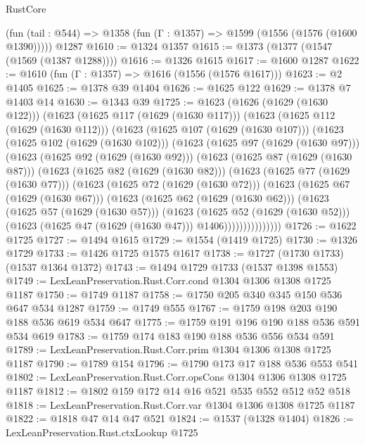 \begin{lexlean}{RustCore}
\begin{coremodule}
    (fun (tail : @544) => @1358 (fun (Γ : @1357) => @1599 (@1556 (@1576 (@1600 @1390)))))
    @1287
@1610 := @1324 @1357
@1615 := @1373 (@1377 (@1547 (@1569 (@1387 @1288))))
@1616 := @1326 @1615
@1617 := @1600 @1287
@1622 := @1610 (fun (Γ : @1357) => @1616 (@1556 (@1576 @1617)))
@1623 := @2 @1405
@1625 := @1378 @39 @1404
@1626 := @1625 @122
@1629 := @1378 @7 @1403 @14
@1630 := @1343 @39
@1725 := @1623
    (@1626 (@1629 (@1630 @122)))
    (@1623
      (@1625 @117 (@1629 (@1630 @117)))
      (@1623
        (@1625 @112 (@1629 (@1630 @112)))
        (@1623
          (@1625 @107 (@1629 (@1630 @107)))
          (@1623
            (@1625 @102 (@1629 (@1630 @102)))
            (@1623
              (@1625 @97 (@1629 (@1630 @97)))
              (@1623
                (@1625 @92 (@1629 (@1630 @92)))
                (@1623
                  (@1625 @87 (@1629 (@1630 @87)))
                  (@1623
                    (@1625 @82 (@1629 (@1630 @82)))
                    (@1623
                      (@1625 @77 (@1629 (@1630 @77)))
                      (@1623
                        (@1625 @72 (@1629 (@1630 @72)))
                        (@1623
                          (@1625 @67 (@1629 (@1630 @67)))
                          (@1623
                            (@1625 @62 (@1629 (@1630 @62)))
                            (@1623
                              (@1625 @57 (@1629 (@1630 @57)))
                              (@1623
                                (@1625 @52 (@1629 (@1630 @52)))
                                (@1623 (@1625 @47 (@1629 (@1630 @47))) @1406)))))))))))))))
@1726 := @1622 @1725
@1727 := @1494 @1615
@1729 := @1554 (@1419 @1725)
@1730 := @1326 @1729
@1733 := @1426 @1725 @1575 @1617
@1738 := @1727 (@1730 @1733) (@1537 @1364 @1372)
@1743 := @1494 @1729 @1733 (@1537 @1398 @1553)
@1749 := LexLeanPreservation.Rust.Corr.cond @1304 @1306 @1308 @1725 @1187
@1750 := @1749 @1187
@1758 := @1750 @205 @340 @345 @150 @536 @647 @534 @1287
@1759 := @1749 @555
@1767 := @1759 @198 @203 @190 @188 @536 @619 @534 @647
@1775 := @1759 @191 @196 @190 @188 @536 @591 @534 @619
@1783 := @1759 @174 @183 @190 @188 @536 @556 @534 @591
@1789 := LexLeanPreservation.Rust.Corr.prim @1304 @1306 @1308 @1725 @1187
@1790 := @1789 @154
@1796 := @1790 @173 @17 @188 @536 @553 @541
@1802 := LexLeanPreservation.Rust.Corr.opsCons @1304 @1306 @1308 @1725 @1187
@1812 := @1802 @159 @172 @14 @16 @521 @535 @552 @512 @52 @518
@1818 := LexLeanPreservation.Rust.Corr.var @1304 @1306 @1308 @1725 @1187
@1822 := @1818 @47 @14 @47 @521
@1824 := @1537 (@1328 @1404)
@1826 := LexLeanPreservation.Rust.ctxLookup @1725

\end{coremodule}
\end{lexlean}
